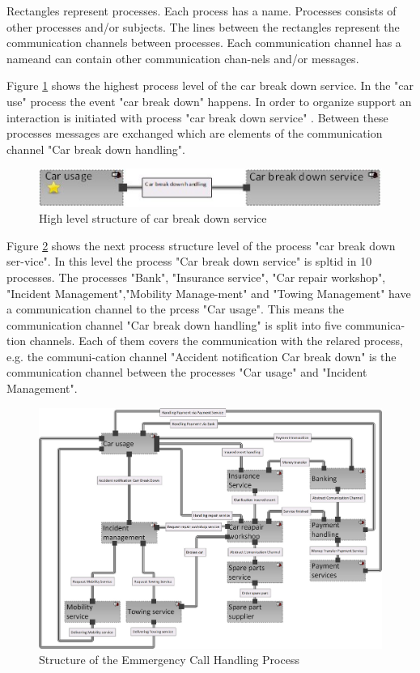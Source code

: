 Rectangles represent processes. Each process has a name. Processes consists of other processes and/or subjects. The lines between the rectangles represent the communication channels between processes. Each communication channel has a nameand can contain other communication chan-nels and/or messages.

Figure \ref{fig:car-service-level1} shows the highest process level of the car break down service. In the "car use" process the event "car break down" happens. In order to organize support an interaction is initiated with process "car break down service" . Between these processes messages are exchanged which are elements of the communication channel "Car break down handling".\\


\begin{figure}[htbp]
	\centering
	\includegraphics[width=0.7\linewidth]{Figures/Chapter5/figures-hierarchy/Car-Service-Level1.jpg}
	\caption[High level structure of car break down service]{High level structure of car break down service}
	\label{fig:car-service-level1}
\end{figure}



Figure \ref{fig:car-service-leve2} shows the next process structure level of the process "car break down ser-vice". In this level the process "Car break down service" is spltid in 10 processes. The processes "Bank", "Insurance service", "Car repair workshop", "Incident Management","Mobility Manage-ment" and "Towing Management" have a communication channel to the prcess "Car usage". This means the communication channel "Car break down handling" is split into five communica-tion channels. Each of them covers the communication with the relared process, e.g. the communi-cation channel "Accident notification Car break down" is the communication channel between the processes "Car usage" and "Incident Management".\\


\begin{figure}[htbp]
	\centering
	\includegraphics[width=0.8\linewidth]{Figures/Chapter5/figures-hierarchy/Car-Service-Leve2}
	\caption[Structure of the Emmergency Call Handling Process]{Structure of the Emmergency Call Handling Process}
	\label{fig:car-service-leve2}
\end{figure}



